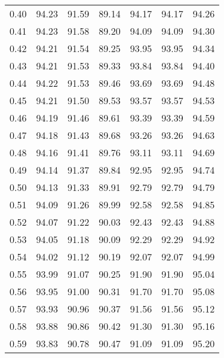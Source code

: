 \begin{tabular}{|c|c|c|c|c|c|c|}
      0.40 &     94.23 &     91.59 &      89.14 &   94.17 &      94.17 &         94.26 \\
      0.41 &     94.23 &     91.58 &      89.20 &   94.09 &      94.09 &         94.30 \\
      0.42 &     94.21 &     91.54 &      89.25 &   93.95 &      93.95 &         94.34 \\
      0.43 &     94.21 &     91.53 &      89.33 &   93.84 &      93.84 &         94.40 \\
      0.44 &     94.22 &     91.53 &      89.46 &   93.69 &      93.69 &         94.48 \\
      0.45 &     94.21 &     91.50 &      89.53 &   93.57 &      93.57 &         94.53 \\
      0.46 &     94.19 &     91.46 &      89.61 &   93.39 &      93.39 &         94.59 \\
      0.47 &     94.18 &     91.43 &      89.68 &   93.26 &      93.26 &         94.63 \\
      0.48 &     94.16 &     91.41 &      89.76 &   93.11 &      93.11 &         94.69 \\
      0.49 &     94.14 &     91.37 &      89.84 &   92.95 &      92.95 &         94.74 \\
      0.50 &     94.13 &     91.33 &      89.91 &   92.79 &      92.79 &         94.79 \\
      0.51 &     94.09 &     91.26 &      89.99 &   92.58 &      92.58 &         94.85 \\
      0.52 &     94.07 &     91.22 &      90.03 &   92.43 &      92.43 &         94.88 \\
      0.53 &     94.05 &     91.18 &      90.09 &   92.29 &      92.29 &         94.92 \\
      0.54 &     94.02 &     91.12 &      90.19 &   92.07 &      92.07 &         94.99 \\
      0.55 &     93.99 &     91.07 &      90.25 &   91.90 &      91.90 &         95.04 \\
      0.56 &     93.95 &     91.00 &      90.31 &   91.70 &      91.70 &         95.08 \\
      0.57 &     93.93 &     90.96 &      90.37 &   91.56 &      91.56 &         95.12 \\
      0.58 &     93.88 &     90.86 &      90.42 &   91.30 &      91.30 &         95.16 \\
      0.59 &     93.83 &     90.78 &      90.47 &   91.09 &      91.09 &         95.20 \\

\end{tabular}
